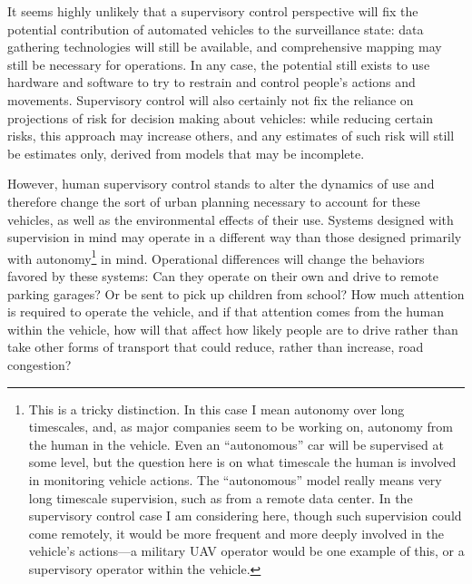 It seems highly unlikely that a supervisory control perspective will
fix the potential contribution of automated vehicles to the
surveillance state:  data gathering technologies will still be
available, and comprehensive mapping may still be necessary for
operations. In any case, the potential still exists to use hardware
and software to try to restrain and control people's actions and
movements. Supervisory control will also certainly not fix the
reliance on projections of risk for decision making about vehicles:
while reducing certain risks, this approach may increase others, and
any estimates of such risk will still be estimates only, derived from
models that may be incomplete.

However, human supervisory control stands to alter the dynamics of use
and therefore change the sort of urban planning necessary to account
for these vehicles, as well as the environmental effects of their use.
Systems designed with supervision in mind may operate in a different
way than those designed primarily with autonomy\footnote{This is a
  tricky distinction. In this case
  I mean autonomy over long timescales, and, as major companies seem
  to be working on, autonomy from the human in the vehicle. Even an
  ``autonomous'' car will be supervised at some level, but the
  question here is on what timescale the human is involved in
  monitoring vehicle actions. The ``autonomous'' model really means very
  long timescale supervision, such as from a remote data center. In
  the supervisory control case I am considering here, though such
  supervision could come remotely, it would be more frequent and more
  deeply involved in the vehicle's actions---a military UAV operator
  would be one example of this, or a supervisory operator within the
  vehicle.} in mind. Operational
differences will change the behaviors favored by these systems:  Can
they operate on their own and drive to remote parking garages? Or be
sent to pick up children from school? How much attention is required
to operate the vehicle, and if that attention comes from the human
within the vehicle, how will that affect how likely people are to
drive rather than take other forms of transport that could reduce,
rather than increase, road congestion? 

